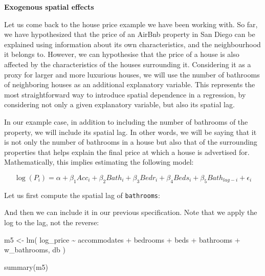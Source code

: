 \documentclass[
  letterpaper,
  krantz2]{style/krantz}
\newenvironment{Shaded}{\begin{snugshade}}{\end{snugshade}}
\newcommand{\FunctionTok}[1]{\textcolor[rgb]{0.28,0.35,0.67}{#1}}
\newcommand{\NormalTok}[1]{\textcolor[rgb]{0.00,0.23,0.31}{#1}}
\newcommand{\OtherTok}[1]{\textcolor[rgb]{0.00,0.23,0.31}{#1}}
\newcommand{\SpecialCharTok}[1]{\textcolor[rgb]{0.37,0.37,0.37}{#1}}
\newcommand{\StringTok}[1]{\textcolor[rgb]{0.13,0.47,0.30}{#1}}
\begin{document}
\textbf{Exogenous spatial effects}

Let us come back to the house price example we have been working with.
So far, we have hypothesized that the price of an AirBnb property in San
Diego can be explained using information about its own characteristics,
and the neighbourhood it belongs to. However, we can hypothesise that
the price of a house is also affected by the characteristics of the
houses surrounding it. Considering it as a proxy for larger and more
luxurious houses, we will use the number of bathrooms of neighboring
houses as an additional explanatory variable. This represents the most
straightforward way to introduce spatial dependence in a regression, by
considering not only a given explanatory variable, but also its spatial
lag.

In our example case, in addition to including the number of bathrooms of
the property, we will include its spatial lag. In other words, we will
be saying that it is not only the number of bathrooms in a house but
also that of the surrounding properties that helps explain the final
price at which a house is advertised for. Mathematically, this implies
estimating the following model:

\[
\log(P_i) = \alpha + \beta_1 Acc_i + \beta_2 Bath_i + \beta_3 Bedr_i + \beta_4 Beds_i+ \beta_5 Bath_{lag-i} + \epsilon_i
\]

Let us first compute the spatial lag of \texttt{bathrooms}:

\begin{Shaded}
\end{Shaded}

And then we can include it in our previous specification. Note that we
apply the log to the lag, not the reverse:

\begin{Shaded}
\begin{Highlighting}[]
\NormalTok{m5 }\OtherTok{\textless{}{-}} \FunctionTok{lm}\NormalTok{(}
  \StringTok{\textquotesingle{}log\_price \textasciitilde{} accommodates + bedrooms + beds + bathrooms + w\_bathrooms\textquotesingle{}}\NormalTok{,}
\NormalTok{  db}
\NormalTok{)}

\FunctionTok{summary}\NormalTok{(m5)}
\end{Highlighting}
\end{Shaded}
\end{document}
